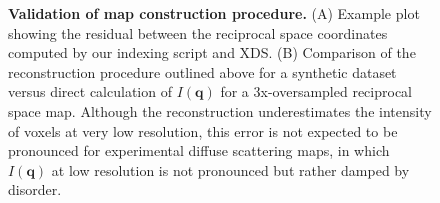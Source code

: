 \documentclass{article}
\begin{document}
\begin{figure}[htb!]
\begin{subfigure}[t]{0.45\textwidth}
\end{subfigure}
\caption{\textbf{Validation of map construction procedure.} (A) Example plot showing the residual between the reciprocal space coordinates computed by our indexing script and XDS. (B) Comparison of the reconstruction procedure outlined above for a synthetic dataset versus direct calculation of $I(\mathbf{q})$ for a 3x-oversampled reciprocal space map. Although the reconstruction underestimates the intensity of voxels at very low resolution, this error is not expected to be pronounced for experimental diffuse scattering maps, in which $I(\mathbf{q})$ at low resolution is not pronounced but rather damped by disorder. }\label{validation}
\end{figure}

\newpage

\end{document}
